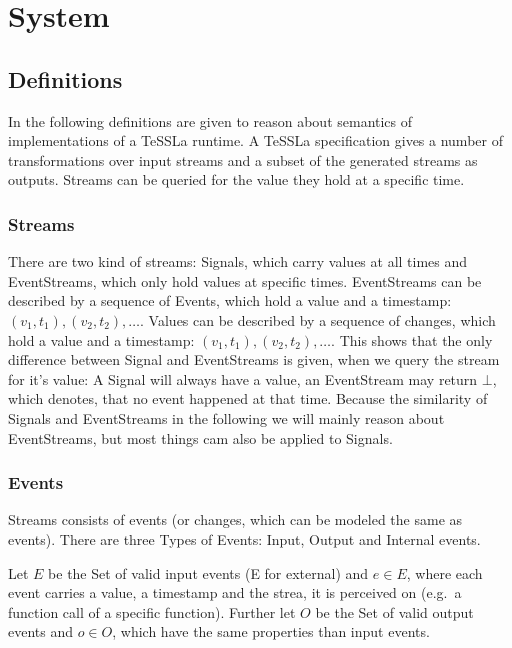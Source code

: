 %
\chapter{System}
\label{sec:system}

\section{Definitions}
\label{sec:system:defs}

In the following definitions are given to reason about semantics of implementations of a TeSSLa runtime.
A TeSSLa specification gives a number of transformations over input streams and a subset of the generated streams as outputs.
Streams can be queried for the value they hold at a specific time.

\subsection{Streams}
\label{sec:system:defs:streams}

There are two kind of streams: Signals, which carry values at all times and EventStreams, which only hold values at specific times.
EventStreams can be described by a sequence of Events, which hold a value and a timestamp: \((v_1,t_1),(v_2,t_2),\ldots\).
Values can be described by a sequence of changes, which hold a value and a timestamp: \((v_1,t_1),(v_2,t_2),\ldots\).
This shows that the only difference between Signal and EventStreams is given, when we query the stream for it's value:
A Signal will always have a value, an EventStream may return \(\bot\), which denotes, that no event happened at that time.
Because the similarity of Signals and EventStreams in the following we will mainly reason about EventStreams, but most things cam also be applied to Signals.

\subsection{Events}
\label{sec:system:defs:events}

Streams consists of events (or changes, which can be modeled the same as events).
There are three Types of Events: Input, Output and Internal events.

Let \(E\) be the Set of valid input events (E for external) and \(e \in E\), where each event carries a value, a timestamp and the
strea, it is perceived on (e.g.\ a function call of a specific function).
Further let \(O\) be the Set of valid output events and \(o \in O\), which have the same properties than input events.

